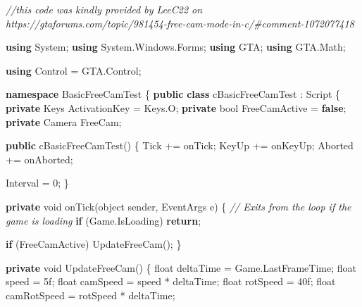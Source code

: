 \documentclass[
  openany]{book}
\newenvironment{Shaded}{\begin{snugshade}}{\end{snugshade}}
\newcommand{\CommentTok}[1]{\textcolor[rgb]{0.56,0.35,0.01}{\textit{#1}}}
\newcommand{\DataTypeTok}[1]{\textcolor[rgb]{0.13,0.29,0.53}{#1}}
\newcommand{\DecValTok}[1]{\textcolor[rgb]{0.00,0.00,0.81}{#1}}
\newcommand{\FunctionTok}[1]{\textcolor[rgb]{0.00,0.00,0.00}{#1}}
\newcommand{\KeywordTok}[1]{\textcolor[rgb]{0.13,0.29,0.53}{\textbf{#1}}}
\newcommand{\NormalTok}[1]{#1}
\begin{document}
\begin{Shaded}
\begin{Highlighting}[]
\CommentTok{//this code was kindly provided by LeeC22 on https://gtaforums.com/topic/981454-free-cam-mode-in-c/#comment-1072077418}

\KeywordTok{using}\NormalTok{ System;}
\KeywordTok{using}\NormalTok{ System.}\FunctionTok{Windows}\NormalTok{.}\FunctionTok{Forms}\NormalTok{;}
\KeywordTok{using}\NormalTok{ GTA;}
\KeywordTok{using}\NormalTok{ GTA.}\FunctionTok{Math}\NormalTok{;}

\KeywordTok{using}\NormalTok{ Control = GTA.}\FunctionTok{Control}\NormalTok{;}

\KeywordTok{namespace}\NormalTok{ BasicFreeCamTest}
\NormalTok{\{}
    \KeywordTok{public} \KeywordTok{class}\NormalTok{ cBasicFreeCamTest : Script}
\NormalTok{    \{}
        \KeywordTok{private}\NormalTok{ Keys ActivationKey = Keys.}\FunctionTok{O}\NormalTok{;}
        \KeywordTok{private} \DataTypeTok{bool}\NormalTok{ FreeCamActive = }\KeywordTok{false}\NormalTok{;}
        \KeywordTok{private}\NormalTok{ Camera FreeCam;}

        \KeywordTok{public} \FunctionTok{cBasicFreeCamTest}\NormalTok{()}
\NormalTok{        \{}
\NormalTok{            Tick += onTick;}
\NormalTok{            KeyUp += onKeyUp;}
\NormalTok{            Aborted += onAborted;}

\NormalTok{            Interval = }\DecValTok{0}\NormalTok{;}
\NormalTok{        \}}

        \KeywordTok{private} \DataTypeTok{void} \FunctionTok{onTick}\NormalTok{(}\DataTypeTok{object}\NormalTok{ sender, EventArgs e)}
\NormalTok{        \{}
            \CommentTok{// Exits from the loop if the game is loading}
            \KeywordTok{if}\NormalTok{ (Game.}\FunctionTok{IsLoading}\NormalTok{) }\KeywordTok{return}\NormalTok{;}

            \KeywordTok{if}\NormalTok{ (FreeCamActive) }\FunctionTok{UpdateFreeCam}\NormalTok{();}
\NormalTok{        \}}

        \KeywordTok{private} \DataTypeTok{void} \FunctionTok{UpdateFreeCam}\NormalTok{()}
\NormalTok{        \{}
            \DataTypeTok{float}\NormalTok{ deltaTime = Game.}\FunctionTok{LastFrameTime}\NormalTok{;}
            \DataTypeTok{float}\NormalTok{ speed = 5f;}
            \DataTypeTok{float}\NormalTok{ camSpeed = speed * deltaTime;}
            \DataTypeTok{float}\NormalTok{ rotSpeed = 40f;}
            \DataTypeTok{float}\NormalTok{ camRotSpeed = rotSpeed * deltaTime;}


\end{Highlighting}
\end{Shaded}
\end{document}
